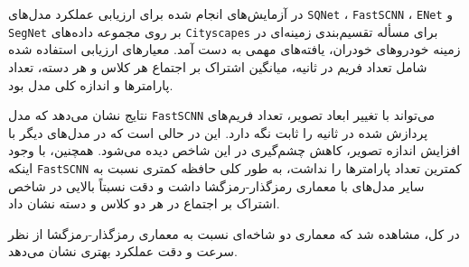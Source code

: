 در آزمایش‌های انجام شده برای ارزیابی عملکرد مدل‌های
\verb*|SQNet|
،
\verb*|FastSCNN|
،
\verb*|ENet|
و
\verb*|SegNet|
بر روی مجموعه داده‌های
\verb*|Cityscapes|
برای مسأله تقسیم‌بندی زمینه‌ای در زمینه خودروهای خودران، یافته‌های مهمی به دست آمد. معیارهای ارزیابی استفاده شده شامل تعداد فریم در ثانیه، میانگین اشتراک بر اجتماع هر کلاس و هر دسته، تعداد پارامترها و اندازه کلی مدل بود.

نتایج نشان می‌دهد که مدل
\verb*|FastSCNN|
می‌تواند با تغییر ابعاد تصویر، تعداد فریم‌های پردازش شده در ثانیه را ثابت نگه دارد. این در حالی است که در مدل‌های دیگر با افزایش اندازه تصویر، کاهش چشم‌گیری در این شاخص دیده می‌شود. همچنین، با وجود اینکه
\verb*|FastSCNN|
کمترین تعداد پارامترها را نداشت، به طور کلی حافظه کمتری نسبت به سایر مدل‌های با معماری رمزگذار-رمزگشا داشت و دقت نسبتاً بالایی در شاخص اشتراک بر اجتماع در هر دو کلاس و دسته نشان داد.

در کل، مشاهده شد که معماری‌ دو شاخه‌ای نسبت به معماری رمزگذار-رمزگشا از نظر سرعت و دقت عملکرد بهتری نشان می‌دهد.

